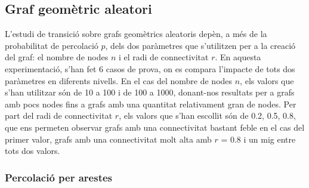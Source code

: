 \documentclass[a4paper]{article}
\begin{document}
	\subsection{Graf geomètric aleatori}
	
	L'estudi de transició sobre grafs geomètrics aleatoris depèn, a més de la probabilitat de percolació $p$, dels dos paràmetres que s'utilitzen per a la creació del graf: el nombre de nodes $n$ i el radi de connectivitat $r$.
	En aquesta experimentació, s'han fet 6 casos de prova, on es compara l'impacte de tots dos paràmetres en diferents nivells. En el cas del nombre de nodes $n$, els valors que s'han utilitzar són de 10 a 100 i de 100 a 1000,
	donant-nos resultats per a grafs amb pocs nodes fins a grafs amb una quantitat relativament gran de nodes. Per part del radi de connectivitat $r$, els valors que s'han escollit són de 0.2, 0.5, 0.8, que ens permeten observar grafs amb una connectivitat
	bastant feble en el cas del primer valor, grafs amb una connectivitat molt alta amb $r$ = 0.8 i un mig entre tots dos valors.
	
	\subsubsection{Percolació per arestes}
	
\end{document}
